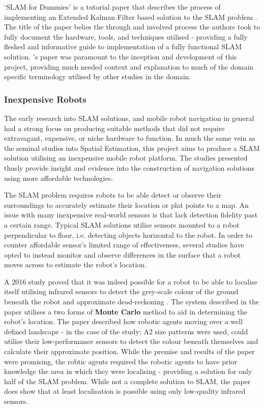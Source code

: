 `SLAM for Dummies' is a tutorial paper that describes the process of
implementing an Extended Kalman Filter based solution to the SLAM problem
\cite{Riisgaard2004}.  
The title of the paper belies the through and involved process the authors
took to fully document the hardware, tools, and techniques utilised -
providing a fully fleshed and informative guide to implementation of a fully
functional SLAM solution.
\citeauthor{Riisgaard2004}'s paper was paramount to the inception and
development of this project, providing much needed context and explanation to
much of the domain specific terminology utilised by other studies in the
domain.

\subsubsection{Inexpensive Robots}
The early research into SLAM solutions, and mobile robot navigation in general
had a strong focus on producing suitable methods that did not require
extravagant, expensive, or niche hardware to function.
In much the same vein as the seminal studies into Spatial Estimation, this
project aims to produce a SLAM solution utilising an inexpensive mobile
robot platform.
The studies presented thusly provide insight and evidence into the
construction of navigation solutions using more affordable technologies.

The SLAM problem requires robots to be able detect or observe their
surroundings to accurately estimate their location or plat points to a map.
An issue with many inexpensive real-world sensors is that lack detection
fidelity past a certain range.
Typical SLAM solutions utilise sensors mounted to a robot perpendicular to
floor, i.e. detecting objects horizontal to the robot.
In order to counter affordable sensor's limited range of effectiveness, several
studies have opted to instead monitor and observe differences in the surface
that a robot moves across to estimate the robot's location.

A 2016 study proved that it was indeed possible for a robot to be able to
localise itself utilising infrared sensors to detect the grey-scale colour of
the ground beneath the robot and approximate dead-reckoning \cite{Wang2016}.
The system described in the paper utilises a two forms of {\bf Monte Carlo}
method to aid in determining the robot's location.
The paper described how robotic agents moving over a well defined landscape -
in the case of the study; A2 size patterns were used, could utilise
their low-performance sensors to detect the colour beneath themselves and
calculate their approximate position.
While the premise and results of the paper were promising, the robtic agents
required the robotic agents to have prior knowledge the area in which they
were localising - providing a solution for only half of the SLAM problem.
While not a complete solution to SLAM, the paper does show that at least
localisation is possible using only low-quality infrared sensors.


